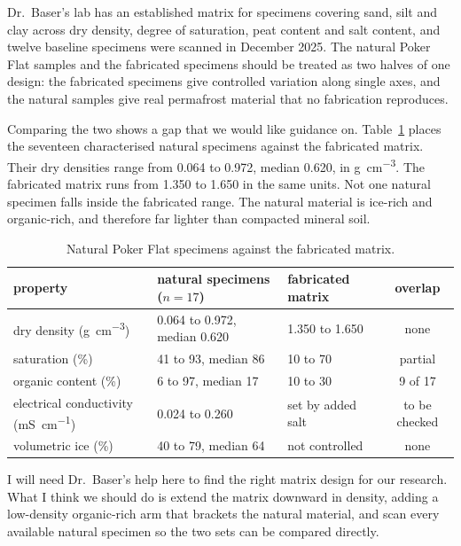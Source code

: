 \documentclass[11pt]{article}
\begin{document}
Dr.\ Baser's lab has an established matrix for specimens
covering sand, silt and clay across dry density, degree of saturation, peat
content and salt content, and twelve baseline specimens were scanned in December
2025. The natural Poker Flat samples and the fabricated specimens should be
treated as two halves of one design: the fabricated specimens give controlled
variation along single axes, and the natural samples give real permafrost
material that no fabrication reproduces.

Comparing the two shows a gap that we would like guidance on.
Table~\ref{tab:matrix} places the seventeen characterised natural
specimens against the fabricated matrix. Their dry densities range from
\num{0.064} to \num{0.972}, median \num{0.620}, in
\si{\gram\per\cubic\centi\meter}. The fabricated matrix runs from \num{1.350}
to \num{1.650} in the same units. Not one natural specimen falls inside the
fabricated range. The natural material is ice-rich and organic-rich, and
therefore far lighter than compacted mineral soil.

\begin{table}[h]
\centering\small
\caption{Natural Poker Flat specimens against the fabricated matrix.}
\label{tab:matrix}
\begin{tabular}{lllc}
\toprule
property & natural specimens ($n=17$) & fabricated matrix & overlap \\
\midrule
dry density (\si{\gram\per\cubic\centi\meter}) & 0.064 to 0.972, median 0.620 & 1.350 to 1.650 & none \\
saturation (\si{\percent}) & 41 to 93, median 86 & 10 to 70 & partial \\
organic content (\si{\percent}) & 6 to 97, median 17 & 10 to 30 & 9 of 17 \\
electrical conductivity (\si{\milli\siemens\per\centi\meter}) & 0.024 to 0.260 & set by added salt & to be checked \\
volumetric ice (\si{\percent}) & 40 to 79, median 64 & not controlled & none \\
\bottomrule
\end{tabular}
\end{table}

I will need Dr.\ Baser's help here to find the right matrix design for our
research. What I think we should do is extend the matrix downward in density,
adding a low-density organic-rich arm that brackets the natural material, and
scan every available natural specimen so the two sets can be compared directly.
\end{document}
